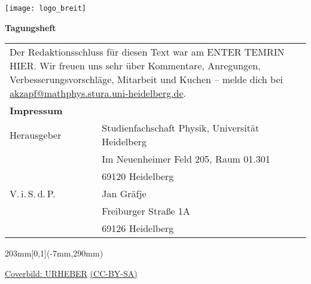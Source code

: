 \documentclass[a5paper]{scrbook}
\begin{document}
\pagestyle{empty}
\centering
\texttt{[image: logo\_breit]} 

\vspace*{14cm} \centering \fontsize{40}{48} \textbf{Tagungsheft}
\normalsize

      
\null
\newpage
{}
\vspace*{\fill}
    \begin{tabular*}{0.77\textwidth}{ll}
        \multicolumn{2}{l}{
            \parbox{0.77\textwidth}{
                Der Redaktionsschluss für diesen Text war am ENTER TEMRIN HIER. Wir freuen uns
                sehr über Kommentare, Anregungen, Verbesserungsvorschläge,
                Mitarbeit und Kuchen -- melde dich bei
                \href{mailto:akzapf@mathphys.stura.uni-heidelberg.de}{akzapf@mathphys.stura.uni-heidelberg.de}.
            }
            \vspace{5cm}
        }\\
        \textbf{Impressum} &\\
        Herausgeber & Studienfachschaft Physik, Universität Heidelberg \\
        & Im Neuenheimer Feld 205, Raum 01.301\\
        & 69120 Heidelberg\\
        V.\,i.\,S.\,d.\,P. & Jan Gräfje\\
        & Freiburger Straße 1A\\
        & 69126 Heidelberg\\
    \end{tabular*}

    \vfill

    \begin{textblock*}{203mm}[0,1](-7mm,290mm)
        \begin{flushright}
            \footnotesize
            \href{http://mathphys.info}{Coverbild: URHEBER} \href{http://creativecommons.org/licenses/by-sa/4.0/}{(CC-BY-SA)}\\  
        \end{flushright}
    \end{textblock*}



\null
\newpage

\pagestyle{empty}
\null
\newpage

\pagestyle{empty}
\null
\newpage
\end{document}
